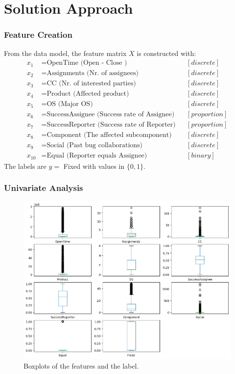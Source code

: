 \documentclass[xcolor=sgvnames,serifs,notes,compress,professionalfont]{beamer}
\begin{document}
\section{Solution Approach}
\begin{frame}
\frametitle{Feature Creation}
From the data model, the feature matrix $X$ is constructed with:
\begin{align*}
x_1 &= \text{OpenTime (Open - Close )} && [discrete]\\
x_2 &= \text{Assignments (Nr. of assignees)}&& [discrete]\\
x_3 &= \text{CC (Nr. of interested parties)}&& [discrete]\\
x_4 &= \text{Product (Affected product)}&& [discrete]\\
x_5 &= \text{OS (Major OS)}&& [discrete]\\
x_6 &= \text{SuccessAssignee (Success rate of Assignee)}&& [proportion]\\
x_7 &= \text{SuccessReporter (Success rate of Reporter)}&& [proportion]\\
x_8 &= \text{Component (The affected subcomponent)}&& [discrete]\\
x_9 &= \text{Social (Past bug collaborations)}&& [discrete]\\
x_{10}&= \text{Equal (Reporter equals Assignee)} && [binary]
\end{align*}
The labels are $y= $ Fixed with values in $\{0,1\}$.
\end{frame}

\begin{frame}
\frametitle{Univariate Analysis}
\begin{figure}
	\includegraphics[height=0.75\textheight]{pictures/boxplots.png}    
	\caption{Boxplots of the features and the label.}
	\label{fig:boxplots}
\end{figure}

\end{frame}
\end{document}
